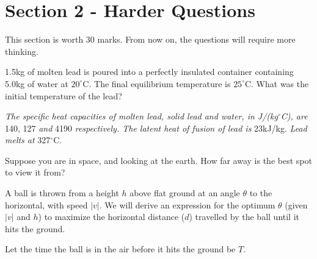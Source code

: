 \documentclass{exam}
\begin{document}
\newpage
\section*{Section 2 - Harder Questions}
This section is worth 30 marks. From now on, the questions will require more thinking.
\vspace{20pt}

\begin{questions}
    \setcounter{question}{5}

    \question[4]
    1.5kg of molten lead is poured into a perfectly insulated container containing 5.0kg of water at $20^\circ$C.
    The final equilibrium temperature is $25^\circ$C.
    What was the initial temperature of the lead?

    \textit{The specific heat capacities of molten lead, solid lead and water, in J/(kg$^\circ$C), are} 140, 127 \textit{and} 4190 \textit{respectively.
    The latent heat of fusion of lead is} 23kJ/kg.
    \textit{Lead melts at} 327$^\circ$C.


    \question[5]
    Suppose you are in space, and looking at the earth. How far away is the best spot to view it from?

    \question
    A ball is thrown from a height $h$ above flat ground at an angle $\theta$ to the horizontal, with speed $|v|$.
    We will derive an expression for the optimum $\theta$ (given $|v|$ and $h$) to maximize the horizontal distance ($d$) travelled by the ball until it hits the ground.

    Let the time the ball is in the air before it hits the ground be $T$.
\end{questions}
\end{document}
